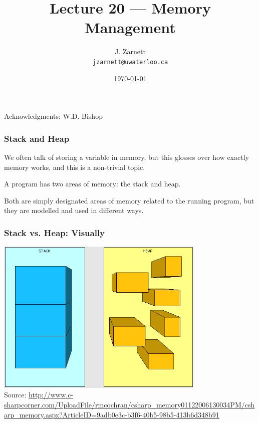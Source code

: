 

\title{Lecture 20 --- Memory Management }

\author{J. Zarnett\\
\texttt{jzarnett@uwaterloo.ca}}
\date{\today}



\begin{frame}
  \titlepage
  
  \begin{center}
  \small{Acknowledgments: W.D. Bishop}
  \end{center}
\end{frame}

\begin{frame}
\frametitle{Stack and Heap}
We often talk of storing a variable in memory, but this glosses over how exactly memory works, and this is a non-trivial topic.

A program has two areas of memory: the \alert{stack} and \alert{heap}.

Both are simply designated areas of memory related to the running program, but they are modelled and used in different ways.

\end{frame}

\begin{frame}
\frametitle{Stack vs. Heap: Visually}

\begin{center}
\includegraphics[width=0.75\textwidth]{images/stackheap.png}\\
{\tiny Source: \url{http://www.c-sharpcorner.com/UploadFile/rmcochran/csharp_memory01122006130034PM/csharp_memory.aspx?ArticleID=9adb0e3c-b3f6-40b5-98b5-413b6d348b91} }
\end{center}

\end{frame}

